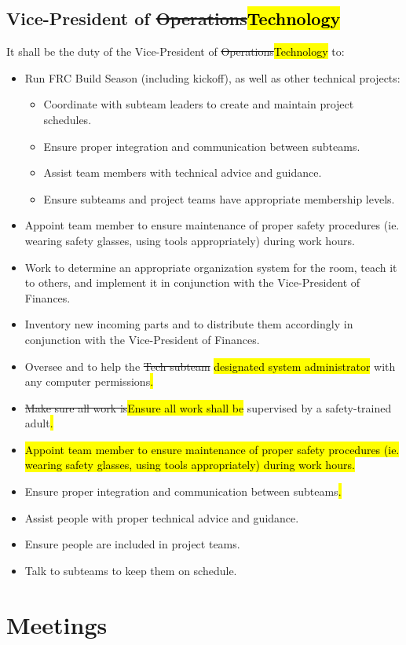 \documentclass[12pt, a4paper]{article}
\begin{document}
\subsection{Vice-President of \st{Operations}\hl{Technology}}
It shall be the duty of the Vice-President of \st{Operations}\hl{Technology} to:
\begin{itemize}
\item Run FRC Build Season (including kickoff), as well as other technical projects:
\begin{itemize}
\item Coordinate with subteam leaders to create and maintain project schedules.
\item Ensure proper integration and communication between subteams.
\item Assist team members with technical advice and guidance.
\item Ensure subteams and project teams have appropriate membership levels.
\end{itemize}
\item Appoint team member to ensure maintenance of proper safety procedures (ie. wearing safety glasses, using tools appropriately) during work hours.
\item Work to determine an appropriate organization system for the room, teach it to others, and implement it in conjunction with the Vice-President of Finances.
\item Inventory new incoming parts and to distribute them accordingly in conjunction with the Vice-President of Finances.
\item Oversee and to help the \st{Tech subteam} \hl{designated system administrator} with any computer permissions\hl{.}
\item \st{Make sure all work is}\hl{Ensure all work shall be} supervised by a safety-trained adult\hl{.}
\item \hl{Appoint team member to ensure maintenance of proper safety procedures (ie. wearing safety glasses, using tools appropriately) during work hours.}
\item Ensure proper integration and communication between subteams\hl{.}
\item Assist people with proper technical advice and guidance.
\item Ensure people are included in project teams.
\item Talk to subteams to keep them on schedule.
\end{itemize}

\section{Meetings}
\end{document}

